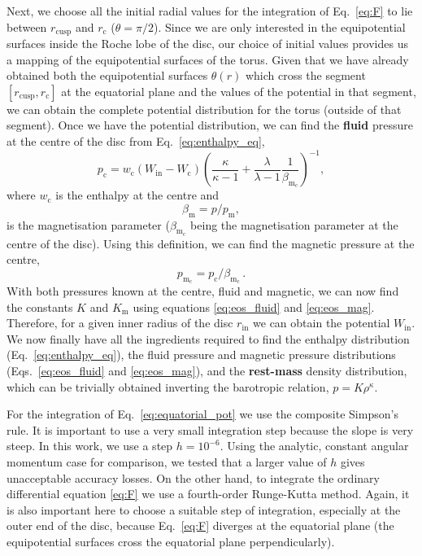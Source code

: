 \documentclass[]{aa}
\begin{document}
Next, we choose all the initial radial values for the integration of Eq.~\eqref{eq:F} to lie between $r_{\mathrm{cusp}}$ and $r_{\mathrm{c}}$ ($\theta = \pi / 2$). Since we are only interested in the equipotential surfaces inside the Roche lobe of the disc, our choice of initial values provides us a mapping of the equipotential surfaces of the torus. Given that we have already obtained both the equipotential surfaces $\theta(r)$ which cross the segment $[r_{\mathrm{cusp}}, r_{\mathrm{c}}]$ at the equatorial plane and the values of the potential in that segment, we can obtain the complete potential distribution for the torus (outside of that segment). Once we have the potential distribution, we can find the {\bf fluid} pressure at the centre of the disc from Eq.~\eqref{eq:enthalpy_eq},
\begin{equation}
p_{\mathrm{c}} = w_{\mathrm{c}}(W_{\mathrm{in}} - W_{\mathrm{c}})\left(\frac{\kappa}{\kappa - 1} + \frac{\lambda
}{\lambda
 - 1}\frac{1}{\beta_{\mathrm{m}_{\mathrm{c}}}}\right)^{-1},
\end{equation}
where $w_{\mathrm{c}}$ is the enthalpy at the centre and
\begin{equation}
\label{eq:beta_eq}
\beta_{\mathrm{m}} = p/p_{\mathrm{m}},
\end{equation}
is the magnetisation parameter ($\beta_{\mathrm{m}_{\mathrm{c}}}$ being the magnetisation parameter at the centre of the disc). Using this definition, we can find the magnetic pressure at the centre,
\begin{equation}
p_{\mathrm{m_{\mathrm{c}}}} = p_{\mathrm{c}}/\beta_{\mathrm{m}_{\mathrm{c}}}\,.
\end{equation}
With both pressures known at the centre, fluid and magnetic, we can now find the constants $K$ and $K_{\mathrm{m}}$ using equations \eqref{eq:eos_fluid} and \eqref{eq:eos_mag}. Therefore, for a given inner radius of the disc $r_{\mathrm{in}}$ we can obtain the potential $W_{\mathrm{in}}$. We now finally have all the ingredients required to find the enthalpy distribution (Eq.~\eqref{eq:enthalpy_eq}), the fluid pressure and magnetic pressure distributions (Eqs.~\eqref{eq:eos_fluid} and \eqref{eq:eos_mag}), and the {\bf rest-mass} density distribution, which can be trivially obtained inverting the barotropic relation, $p = K \rho^{\kappa}$. 

For the integration of Eq.~\eqref{eq:equatorial_pot} we use the composite Simpson's rule. It is important to use a very small integration step because the slope is very steep. In this work, we use a step $h = 10^{-6}$. Using the analytic, constant angular momentum case for comparison, we tested that 
a larger value of $h$ gives unacceptable accuracy losses. On the other hand, to integrate the ordinary differential equation \eqref{eq:F} we use a fourth-order Runge-Kutta method. Again, it is also important here to choose a suitable step of integration, especially at the outer end of the disc, because Eq.~\eqref{eq:F} diverges at the equatorial plane (the equipotential surfaces cross the equatorial plane perpendicularly).
\end{document}
